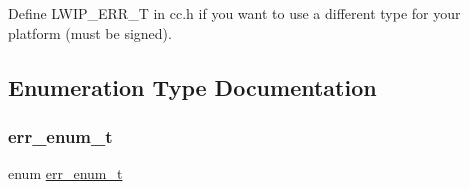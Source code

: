 Define L\+W\+I\+P\+\_\+\+E\+R\+R\+\_\+T in cc.\+h if you want to use a different type for your platform (must be signed). 

\subsection{Enumeration Type Documentation}
\mbox{\label{group__infrastructure__errors_gae2e66c7d13afc90ffecd6151680fbadc}} 
\subsubsection{\texorpdfstring{err\+\_\+enum\+\_\+t}{err\_enum\_t}\hspace{0.1cm}{\footnotesize\ttfamily [1/2]}}
{\footnotesize\ttfamily enum \hyperlink{group__infrastructure__errors_gae2e66c7d13afc90ffecd6151680fbadc}{err\+\_\+enum\+\_\+t}}


